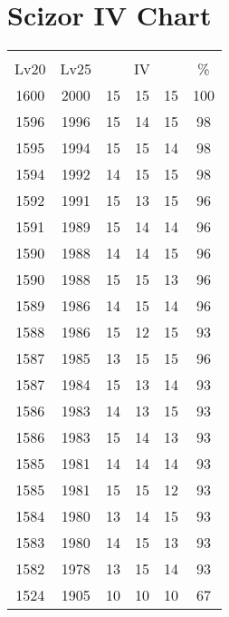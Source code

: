 \documentclass{article}%
\begin{document}
%
\normalsize%
\section{Scizor IV Chart}%
\label{sec:Scizor IV Chart}%
\renewcommand{\arraystretch}{1.5}%
\begin{tabular}{|c|c|c|c|c|c|}%
\hline%
\multicolumn{6}{|c|}{\textcolor{white}{ 
\linebreak{Scizor}
}%
\cellcolor{black}}\\%
\multicolumn{1}{|c}{Lv20}&\multicolumn{1}{c|}{Lv25}&\multicolumn{3}{c|}{IV}&\multicolumn{1}{|c|}{\%}\\%
\hline%
\rowcolor{color100}%
1600&2000&15&15&15&100\\%
\hline%
\rowcolor{color98}%
1596&1996&15&14&15&98\\%
\hline%
\rowcolor{color98}%
1595&1994&15&15&14&98\\%
\hline%
\rowcolor{color98}%
1594&1992&14&15&15&98\\%
\hline%
\rowcolor{color96}%
1592&1991&15&13&15&96\\%
\hline%
\rowcolor{color96}%
1591&1989&15&14&14&96\\%
\hline%
\rowcolor{color96}%
1590&1988&14&14&15&96\\%
\hline%
\rowcolor{color96}%
1590&1988&15&15&13&96\\%
\hline%
\rowcolor{color96}%
1589&1986&14&15&14&96\\%
\hline%
\rowcolor{color93}%
1588&1986&15&12&15&93\\%
\hline%
\rowcolor{color96}%
1587&1985&13&15&15&96\\%
\hline%
\rowcolor{color93}%
1587&1984&15&13&14&93\\%
\hline%
\rowcolor{color93}%
1586&1983&14&13&15&93\\%
\hline%
\rowcolor{color93}%
1586&1983&15&14&13&93\\%
\hline%
\rowcolor{color93}%
1585&1981&14&14&14&93\\%
\hline%
\rowcolor{color93}%
1585&1981&15&15&12&93\\%
\hline%
\rowcolor{color93}%
1584&1980&13&14&15&93\\%
\hline%
\rowcolor{color93}%
1583&1980&14&15&13&93\\%
\hline%
\rowcolor{color93}%
1582&1978&13&15&14&93\\%
\hline%
\rowcolor{color91}%
1524&1905&10&10&10&67\\%
\end{tabular}

%
\end{document}
